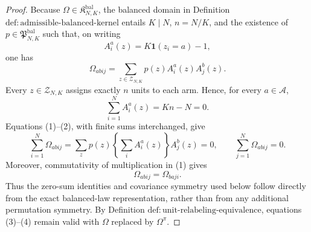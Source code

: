 \documentclass{article}
\begin{document}
\begin{proof}
Because \(\Omega\in\mathfrak K^{\mathrm{bal}}_{N,K}\), the balanced domain in Definition \(\mathrm{def{:}admissible\text{-}balanced\text{-}kernel}\) entails \(K\mid N\), \(n=N/K\), and the existence of \(p\in\mathfrak P^{\mathrm{bal}}_{N,K}\) such that, on writing
\[
 A_i^a(z)=K\mathbf 1(z_i=a)-1,
\]
one has
\[
 \Omega_{abij}=\sum_{z\in\mathcal Z_{N,K}}p(z)A_i^a(z)A_j^b(z). \tag{1}
\]
Every \(z\in\mathcal Z_{N,K}\) assigns exactly \(n\) units to each arm.  Hence, for every \(a\in\mathcal A\),
\[
 \sum_{i=1}^N A_i^a(z)=Kn-N=0. \tag{2}
\]
Equations (1)--(2), with finite sums interchanged, give
\[
 \sum_{i=1}^N\Omega_{abij}
 =\sum_zp(z)\left\{\sum_iA_i^a(z)\right\}A_j^b(z)=0,
 \qquad
 \sum_{j=1}^N\Omega_{abij}=0. \tag{3}
\]
Moreover, commutativity of multiplication in (1) gives
\[
 \Omega_{abij}=\Omega_{baji}. \tag{4}
\]
Thus the zero-sum identities and covariance symmetry used below follow directly from the exact balanced-law representation, rather than from any additional permutation symmetry.  By Definition \(\mathrm{def{:}unit\text{-}relabeling\text{-}equivalence}\), equations (3)--(4) remain valid with \(\Omega\) replaced by \(\Omega^\pi\).


\end{proof}
\end{document}
